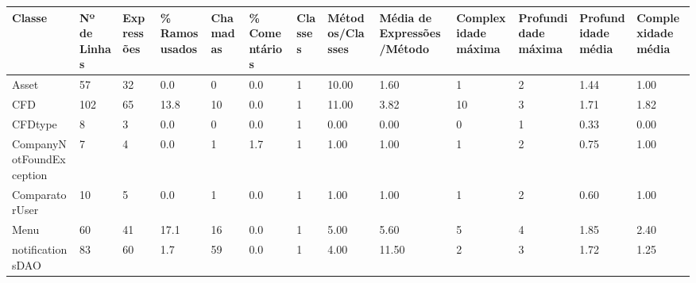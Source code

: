 \begin{table}[ht]
\centering
\begin{adjustbox}{width=1\textwidth}
\small
\begin{tabular}{|l|l|l|l|l|l|l|l|l|l|l|l|l|}
\hline
Classe                       & Nº de Linhas & Expressões & \% Ramos usados & Chamadas & \% Comentários & Classes & Métodos/Classes & Média de Expressões/Método & Complexidade máxima & Profundidade máxima & Profundidade média & Complexidade média \\ \hline
Asset                        & 57           & 32         & 0.0             & 0        & 0.0            & 1       & 10.00           & 1.60                       & 1                   & 2                   & 1.44               & 1.00               \\ \hline
CFD                          & 102          & 65         & 13.8            & 10       & 0.0            & 1       & 11.00           & 3.82                       & 10                  & 3                   & 1.71               & 1.82               \\ \hline
CFDtype                      & 8            & 3          & 0.0             & 0        & 0.0            & 1       & 0.00            & 0.00                       & 0                   & 1                   & 0.33               & 0.00               \\ \hline
CompanyNotFoundException     & 7            & 4          & 0.0             & 1        & 1.7            & 1       & 1.00            & 1.00                       & 1                   & 2                   & 0.75               & 1.00               \\ \hline
ComparatorUser               & 10           & 5          & 0.0             & 1        & 0.0            & 1       & 1.00            & 1.00                       & 1                   & 2                   & 0.60               & 1.00               \\ \hline
Menu                         & 60           & 41         & 17.1            & 16       & 0.0            & 1       & 5.00            & 5.60                       & 5                   & 4                   & 1.85               & 2.40               \\ \hline
notificationsDAO             & 83           & 60         & 1.7             & 59       & 0.0            & 1       & 4.00            & 11.50                      & 2                   & 3                   & 1.72               & 1.25               \\ \hline

\end{tabular}
\end{adjustbox}
\end{table}
